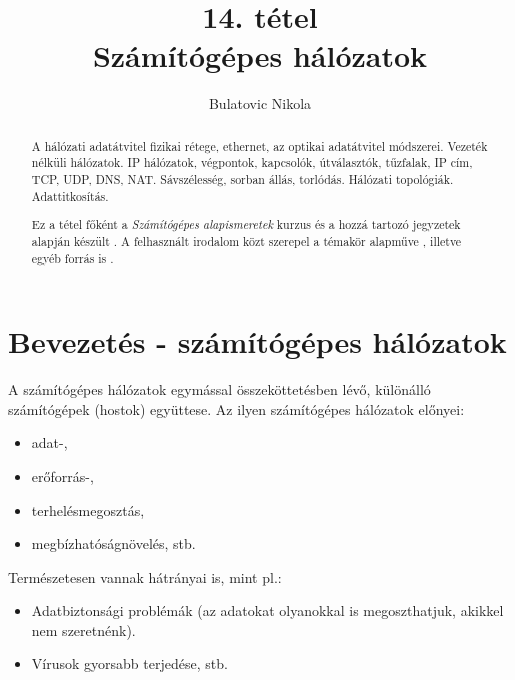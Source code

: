 \documentclass[12pt]{article}
\theoremstyle{plain}
\begin{document}
\title{14. tétel \\ Számítógépes hálózatok}
\author{Bulatovic Nikola}

\maketitle

\begin{abstract}
    A hálózati adatátvitel fizikai rétege, ethernet, az optikai adatátvitel módszerei. Vezeték nélküli hálózatok. IP hálózatok, végpontok, kapcsolók, útválasztók, tűzfalak, IP cím, TCP, UDP, DNS, NAT. Sávszélesség, sorban állás, torlódás. Hálózati topológiák. Adattitkosítás. \par
    Ez a tétel főként a \textit{Számítógépes alapismeretek} kurzus és a hozzá tartozó jegyzetek alapján készült \cite{szamalap1, szamalap2}. A felhasznált irodalom közt szerepel a témakör alapműve \cite{tanenbaum}, illetve egyéb forrás is \cite{magyar}.

\end{abstract}

\tableofcontents
\newpage

\section{Bevezetés - számítógépes hálózatok}

A számítógépes hálózatok egymással összeköttetésben lévő, különálló számítógépek (hostok) együttese. Az ilyen számítógépes hálózatok előnyei:
\begin{itemize}
\setlength\itemsep{-0.2em}
    \item adat-,
    \item erőforrás-,
    \item terhelésmegosztás, 
    \item megbízhatóságnövelés, stb.
\end{itemize}{}
Természetesen vannak hátrányai is, mint pl.:
\begin{itemize}
\setlength\itemsep{-0.2em}
    \item Adatbiztonsági problémák (az adatokat olyanokkal is megoszthatjuk, akikkel nem szeretnénk).
    \item Vírusok gyorsabb terjedése, stb.
\end{itemize}{}
\end{document}
